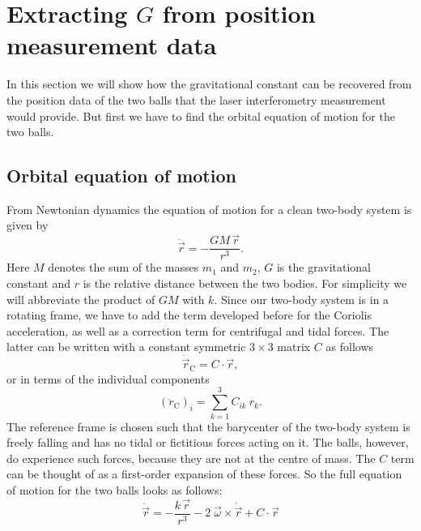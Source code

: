 \documentclass[]{rsos}
\begin{document}
\section{Extracting $G$ from position measurement data}

In this section we will show how the gravitational constant can be
recovered from the position data of the two balls that the laser
interferometry measurement would provide.  But first we have to find
the orbital equation of motion for the two balls.

\subsection{Orbital equation of motion}
From Newtonian dynamics the equation of motion for a clean two-body system is given by 
\begin{equation}
\label{eq:eomeasy}
\ddot{\vec{r}} = - \frac{G M\, \vec{r}}{r^3}.
\end{equation}
Here $M$ denotes the sum of the masses $m_1$ and $m_2$, $G$ is the
gravitational constant and $r$ is the relative distance between the
two bodies. For simplicity we will abbreviate the product of $GM$ with
$k$.  Since our two-body system is in a rotating frame, we have to add
the term developed before for the Coriolis acceleration, as well as a
correction term for centrifugal and tidal forces. The latter can be
written with a constant symmetric $3 \times 3$ matrix $C$ as follows
\begin{equation}
\label{eq:tidal}
\ddot{\vec{r}}_{\mathrm{C}} = C \cdot \vec{r},
\end{equation}
or in terms of the individual components 
\begin{equation}
\label{eq:tidacom}
\left(\ddot{r}_\mathrm{C}\right)_i = \sum_{k=1}^{3} C_{ik} \: r_k.
\end{equation}
The reference frame is chosen such that the barycenter of the two-body
system is freely falling and has no tidal or fictitious forces acting
on it.  The balls, however, do experience such forces, because they
are not at the centre of mass.  The $C$ term can be thought of as a
first-order expansion of these forces.  So the full equation of motion
for the two balls looks as follows:
\begin{equation}
\label{eq:eom}
\ddot{\vec{r}} = - \frac{k\,\vec{r}}{r^3} - 2 \; \vec{\omega} \times \dot{\vec{r}} + C \cdot \vec{r}
\end{equation}
\end{document}
